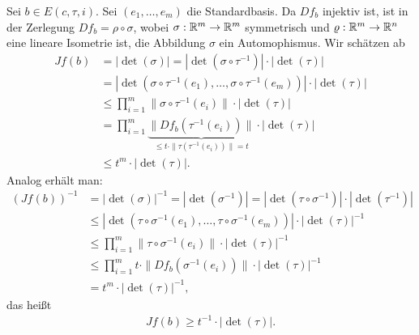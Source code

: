 \documentclass[a4paper,twoside,DIV15,BCOR12mm]{scrbook}
\begin{document}
\begin{beweis}
Sei $b\in E(c,\tau,i)$. Sei $(e_1,\ldots,e_m)$ die Standardbasis. Da $Df_b$ injektiv ist, ist in der Zerlegung $Df_b=\rho\circ\sigma$, wobei $\sigma:\mathbb{R}^m\to\mathbb{R}^m$ symmetrisch und $\varrho:\mathbb{R}^m\to\mathbb{R}^n$ eine lineare Isometrie ist, die Abbildung $\sigma$ ein Automophismus. Wir schätzen ab
\begin{align*}
Jf(b) &= |\det(\sigma)| = |\det(\sigma\circ\tau^{-1})|\cdot |\det(\tau)|\\
&= |\det(\sigma\circ\tau^{-1}(e_1),\ldots,\sigma\circ\tau^{-1}(e_m))| \cdot |\det(\tau)| \\
&\le \prod_{i=1}^m \|\sigma\circ\tau^{-1}(e_i)\| \cdot |\det(\tau)| \\
&= \prod_{i=1}^m \underbrace{\|Df_b(\tau^{-1}(e_i))\|}_{\le t\cdot \|\tau(\tau^{-1}(e_i))\| = t}\cdot |\det(\tau)| \\
&\le t^m \cdot |\det(\tau)|.
\end{align*}
Analog erhält man:
\begin{align*}
(Jf(b))^{-1} &= |\det(\sigma)|^{-1} = |\det(\sigma^{-1})| = |\det(\tau\circ\sigma^{-1})| \cdot |\det(\tau^{-1})| \\
&\le |\det(\tau \circ \sigma^{-1}(e_1),\ldots,\tau\circ\sigma^{-1}(e_m))| \cdot |\det(\tau)|^{-1} \\
&\le \prod_{i=1}^m \|\tau \circ \sigma^{-1} (e_i)\|\cdot|\det(\tau)|^{-1} \\
&\le \prod_{i=1}^m t \cdot \|Df_b(\sigma^{-1}(e_i))\| \cdot |\det(\tau)|^{-1} \\
&= t^m \cdot |\det(\tau)|^{-1},
\end{align*}
das heißt
\begin{align*}
Jf(b) \ge t^{-1}\cdot |\det(\tau)|.
\end{align*}


\end{beweis}
\end{document}
